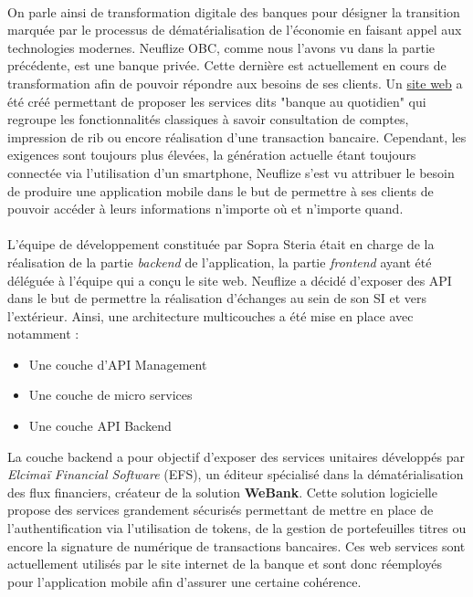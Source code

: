 \paragraph{}
On parle ainsi de transformation digitale des banques pour désigner la transition marquée par le processus de dématérialisation de l'économie en faisant appel aux technologies modernes. Neuflize OBC, comme nous l'avons vu dans la partie précédente, est une banque privée. Cette dernière est actuellement en cours de transformation afin de pouvoir répondre aux besoins de ses clients. Un \href{https://www.neuflizeobc.net/portail/portail.jsp}{site web} a été créé permettant de proposer les services dits "banque au quotidien" qui regroupe les fonctionnalités classiques à savoir consultation de comptes, impression de rib ou encore réalisation d'une transaction bancaire. Cependant, les exigences sont toujours plus élevées, la génération actuelle étant toujours connectée via l'utilisation d'un smartphone, Neuflize s'est vu attribuer le besoin de produire une application mobile dans le but de permettre à ses clients de pouvoir accéder à leurs informations n'importe où et n'importe quand.

\paragraph{}
L'équipe de développement constituée par Sopra Steria était en charge de la réalisation de la partie \textit{backend} de l'application, la partie \textit{frontend} ayant été déléguée à l'équipe qui a conçu le site web. Neuflize a décidé d'exposer des API dans le but de permettre la réalisation d'échanges au sein de son SI et vers l'extérieur. Ainsi, une architecture multicouches a été mise en place avec notamment : \\

\begin{itemize}
	\item Une couche d'API Management
	\item Une couche de micro services
	\item Une couche API Backend \\
\end{itemize} 

La couche backend a pour objectif d'exposer des services unitaires développés par \textit{Elcimaï Financial Software} (EFS), un éditeur spécialisé dans la dématérialisation des flux financiers, créateur de la solution \textbf{WeBank}. Cette solution logicielle propose des services grandement sécurisés permettant de mettre en place de l'authentification via l'utilisation de tokens, de la gestion de portefeuilles titres ou encore la signature de numérique de transactions bancaires. Ces web services sont actuellement utilisés par le site internet de la banque et sont donc réemployés pour l'application mobile afin d'assurer une certaine cohérence. \\


